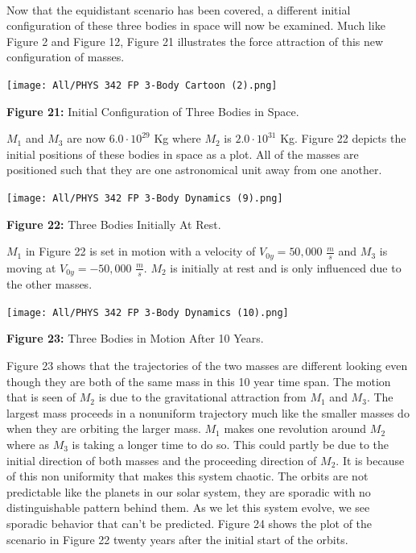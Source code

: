 \documentclass[]{article}
\begin{document}
\begin{multicols}{2}
\paragraph{}
\setlength{\parskip}{1em}
Now that the equidistant scenario has been covered, a different initial configuration of these three bodies in space will now be examined. Much like Figure 2 and Figure 12, Figure 21 illustrates the force attraction of this new configuration of masses.
\begin{center}
\texttt{[image: All/PHYS 342 FP 3-Body Cartoon (2).png]}
\caption{\small{\textbf{Figure 21:}} \tiny{Initial Configuration of Three Bodies in Space.}}
\end{center}
$M_1$ and $M_3$ are now $6.0\cdot10^{29}$ Kg where $M_2$ is $2.0\cdot10^{31}$ Kg. Figure 22 depicts the initial positions of these bodies in space as a plot. All of the masses are positioned such that they are one astronomical unit away from one another. 
\begin{center}
\texttt{[image: All/PHYS 342 FP 3-Body Dynamics (9).png]}
\caption{\small{\textbf{Figure 22:}} \tiny{Three Bodies Initially At Rest.}}
\end{center}
$M_1$ in Figure 22 is set in motion with a velocity of $V_{0y}=50,000$ $\frac{m}{s}$ and $M_3$ is moving at $V_{0y}=-50,000$ $\frac{m}{s}$. $M_2$ is initially at rest and is only influenced due to the other masses. 
\begin{center}
\texttt{[image: All/PHYS 342 FP 3-Body Dynamics (10).png]}
\caption{\small{\textbf{Figure 23:}} \tiny{Three Bodies in Motion After 10 Years.}}
\end{center}
Figure 23 shows that the trajectories of the two masses are different looking even though they are both of the same mass in this 10 year time span. The motion that is seen of $M_2$ is due to the gravitational attraction from $M_1$ and $M_3$. The largest mass proceeds in a nonuniform trajectory much like the smaller masses do when they are orbiting the larger mass. $M_1$ makes one revolution around $M_2$ where as $M_3$ is taking a longer time to do so. This could partly be due to the initial direction of both masses and the proceeding direction of $M_2$. It is because of this non uniformity that makes this system chaotic. The orbits are not predictable like the planets in our solar system, they are sporadic with no distinguishable pattern behind them. As we let this system evolve, we see sporadic behavior that can't be predicted. Figure 24 shows the plot of the scenario in Figure 22 twenty years after the initial start of the orbits. 

\end{multicols}
\end{document}
